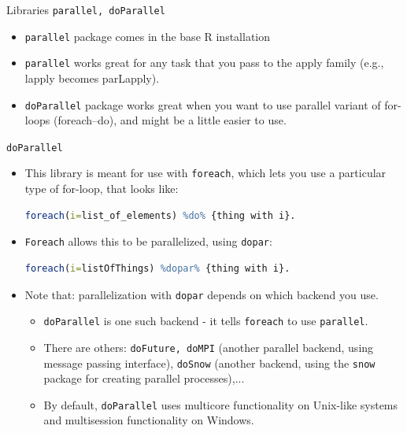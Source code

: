 \documentclass[compress,xcolor=table]{beamer}
\newcommand{\pp}{\pause}
\begin{document}
\begin{frame}{Libraries {\tt parallel, doParallel}}
	\begin{itemize}
		\item {\tt parallel} package comes in the base R installation
		\item {\tt parallel} works great for any task that you pass to  the apply family (e.g., lapply becomes parLapply). 
		\item {\tt doParallel} package works great when you want to use parallel variant of for-loops (foreach--do), and might be a little easier to use.
	\end{itemize}
\end{frame}







\begin{frame}[fragile]{{\tt doParallel}}
\begin{itemize}\small 
\item 	This library 
	is meant for use with {\tt foreach}, which lets you use a particular type of for-loop, that looks like:
	\begin{lstlisting}[basicstyle=\color{blue}\tiny\ttfamily,language=R,escapeinside=`']
		foreach(i=list_of_elements) %do% {thing with i}.
	\end{lstlisting}
	\pp 
	\item 
	{\tt Foreach} allows this to be parallelized, using {\tt dopar}:
	\begin{lstlisting}[basicstyle=\color{blue}\tiny\ttfamily,language=R,escapeinside=`']
		foreach(i=listOfThings) %dopar% {thing with i}.
	\end{lstlisting}
	\pp 
	\item Note that: 
	parallelization with {\tt dopar} depends on which backend you use. 
	\begin{itemize}
		\item 
		{\tt doParallel} is one such backend - it tells {\tt foreach} to use {\tt parallel}. 
		\item There are others:  {\tt doFuture, doMPI} (another parallel backend, using message passing interface), {\tt doSnow} (another backend, using the {\tt  snow} package for creating parallel processes),...
		\item By default, {\tt doParallel} uses multicore functionality on Unix-like systems and multisession  functionality on Windows.
		
	\end{itemize}
\end{itemize}

\end{frame}
\end{document}
